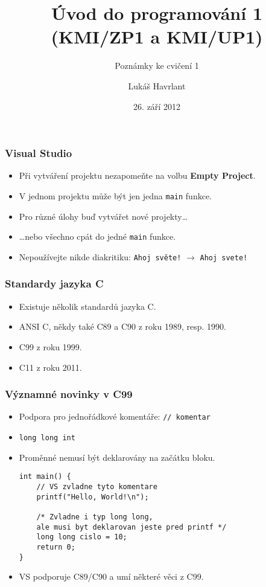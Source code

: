 \documentclass{beamer}
\title{Úvod do programování 1 (KMI/ZP1 a KMI/UP1)}
\subtitle{Poznámky ke cvičení 1}
\author{Lukáš Havrlant}
\date{26. září 2012}
\institute{Univerzita Palackého}
\newenvironment{itemizex}%
  {\large \begin{itemize}%
    \setlength{\itemsep}{8pt}%
    \setlength{\parskip}{8pt}}%
  {\end{itemize}}
\begin{document}
\begin{frame}[t,plain]
\titlepage
\end{frame}

\begin{frame}[t,fragile]\frametitle{Visual Studio} 
  \begin{itemizex}
    \item Při vytváření projektu nezapomeňte na volbu \textbf{Empty Project}.
    \item V jednom projektu může být jen jedna \texttt{main} funkce. 
    \item Pro různé úlohy buď vytvářet nové projekty\dots
    \item \dots nebo všechno cpát do jedné \texttt{main} funkce.
    \item Nepoužívejte nikde diakritiku: \texttt{Ahoj světe!} $\longrightarrow$ \texttt{Ahoj svete!}
  \end{itemizex}
\end{frame}



\begin{frame}[t,fragile]\frametitle{Standardy jazyka C} 
  \begin{itemizex}
    \item Existuje několik standardů jazyka C. 
    \item ANSI C, někdy také C89 a C90 z roku 1989, resp. 1990.
    \item C99 z roku 1999.
    \item C11 z roku 2011. 
  \end{itemizex}
\end{frame}


\begin{frame}[t,fragile]\frametitle{Významné novinky v C99} 
  \begin{itemize}
    \item Podpora pro jednořádkové komentáře: \texttt{// komentar}
    \item \texttt{long long int}
    \item Proměnné nemusí být deklarovány na začátku bloku.
    \begin{verbatim} 
int main() {
    // VS zvladne tyto komentare
    printf("Hello, World!\n");

    /* Zvladne i typ long long, 
    ale musi byt deklarovan jeste pred printf */
    long long cislo = 10; 
    return 0;
}
    \end{verbatim}
    \item VS podporuje C89/C90 a umí některé věci z C99.
  \end{itemize}
\end{frame}
\end{document}
